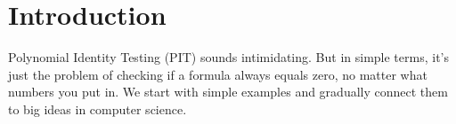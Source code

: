 \section{Introduction}

Polynomial Identity Testing (PIT) sounds intimidating. But in simple terms, it’s just the problem of checking if a formula always equals zero, no matter what numbers you put in. We start with simple examples and gradually connect them to big ideas in computer science.